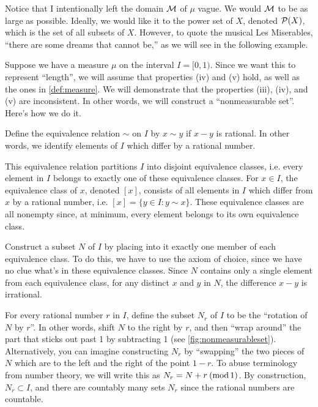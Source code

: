 \documentclass[main.tex]{subfiles}
\begin{document}
Notice that I intentionally left the domain ${\mathcal M}$ of $\mu$ vague. We would ${\mathcal M}$ to be as large as possible. Ideally, we would like it to the power set of $X$, denoted ${\mathcal P}(X)$, which is the set of all subsets of $X$. However, to quote the musical Les Miserables, ``there are some dreams that cannot be,'' as we will see in the following example.

\begin{example}\label{ex:nonmeasurableset}
Suppose we have a measure $\mu$ on the interval $I = [0, 1)$. Since we want this to represent ``length'', we will assume that properties (iv) and (v) hold, as well as the ones in \cref{def:measure}. We will demonstrate that the properties (iii), (iv), and (v) are inconsistent. In other words, we will construct a ``nonmeasurable set''. Here's how we do it.
\begin{remunerate}
	\item Define the equivalence relation $\sim$ on $I$ by $x \sim y$ if $x - y$ is rational. In other words, we identify elements of $I$ which differ by a rational number. 
	\item This equivalence relation partitions $I$ into disjoint equivalence classes, i.e. every element in $I$ belongs to exactly one of these equivalence classes. For $x \in I$, the equivalence class of $x$, denoted $[x]$, consists of all elements in $I$ which differ from $x$ by a rational number, i.e. $[x] = \{ y \in I : y \sim x \}$. These equivalence classes are all nonempty since, at minimum, every element belongs to its own equivalence class. 
	\item Construct a subset $N$ of $I$ by placing into it exactly one member of each equivalence class. To do this, we have to use the axiom of choice, since we have no clue what's in these equivalence classes. Since $N$ contains only a single element from each equivalence class, for any distinct $x$ and $y$ in $N$, the difference $x-y$ is irrational.
	\item For every rational number $r$ in $I$, define the subset $N_r$ of $I$ to be the ``rotation of $N$ by $r$''. In other words, shift $N$ to the right by $r$, and then ``wrap around'' the part that sticks out past 1 by subtracting 1 (see \cref{fig:nonmeasurableset}). Alternatively, you can imagine constructing $N_r$ by ``swapping'' the two pieces of $N$ which are to the left and the right of the point $1-r$. To abuse terminology from number theory, we will write this as $N_r = N + r\:(\operatorname{mod} 1)$. By construction, $N_r \subset I$, and there are countably many sets $N_r$ since the rational numbers are countable.

\end{remunerate}
\end{example}
\end{document}
